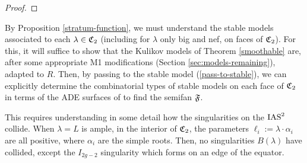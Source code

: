 \documentclass{amsart}
\begin{document}
\begin{proof}
%
%
%
%
%
%
%
%
%  
%  
  \end{proof}


\bigskip

By Proposition \ref{stratum-function}, we must understand 
the stable models associated to each $\lambda\in {\mathfrak C}_2$ (including
for $\lambda$ only big and nef, on faces of ${\mathfrak C}_2$). For this, it will
suffice to show that the Kulikov models of Theorem \ref{smoothable}
are, after some appropriate M1 modifications (Section \ref{sec:models-remaining}),
adapted to $R$. Then, by passing to the stable model (\ref{pass-to-stable}),
we can explicitly determine the combinatorial
types of stable models on each face of ${\mathfrak C}_2$
in terms of the ADE surfaces of \cite{alexeev17ade-surfaces}
to find the semifan ${\mathfrak F}$.

This requires understanding in some detail how the singularities on the $\operatorname{IAS}^2$ collide.
When $\lambda=L$ is ample, in the interior of ${\mathfrak C}_2$, the parameters
$\ell_i := \lambda\cdot\alpha_i$ are all positive, where $\alpha_i$ are
the simple roots. Then, no singularities $B(\lambda)$ have collided,
except the $I_{2g-2}$ singularity which forms on an edge of the equator.
\end{document}
